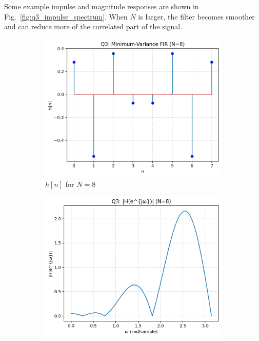 \documentclass[12pt,a4paper]{article}
\begin{document}
Some example impulse and magnitude responses are shown in Fig.~\ref{fig:q3_impulse_spectrum}.  
When $N$ is larger, the filter becomes smoother and can reduce more of the correlated part of the signal.

\begin{figure}[H]
    \centering
    \begin{subfigure}{0.48\textwidth}
        \includegraphics[width=\linewidth]{outputs/q3/N8/q3_impulse_N8.png}
        \caption{$h[n]$ for $N=8$}
    \end{subfigure}\hfill
    \begin{subfigure}{0.48\textwidth}
        \includegraphics[width=\linewidth]{outputs/q3/N8/q3_spectrum_N8.png}

\end{subfigure}
\end{figure}
\end{document}
